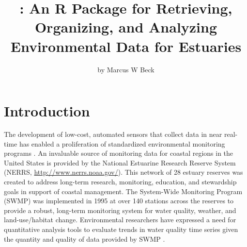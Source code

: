 \title{: An R Package for Retrieving, Organizing, and Analyzing Environmental Data for Estuaries}
\author{by Marcus W Beck}

\maketitle


\section{Introduction}

The development of low-cost, automated sensors that collect data in near real-time has enabled a proliferation of standardized environmental monitoring programs \citep{Glasgow04,Fries08}.  An invaluable source of monitoring data for coastal regions in the United States is provided by the National Estuarine Research Reserve System (NERRS, \url{http://www.nerrs.noaa.gov/}).  This network of 28 estuary reserves was created to address long-term research, monitoring, education, and stewardship goals in support of coastal management.  The System-Wide Monitoring Program (SWMP) was implemented in 1995 at over 140 stations across the reserves to provide a robust, long-term monitoring system for water quality, weather, and land-use/habitat change.  Environmental researchers have expressed a need for quantitative analysis tools to evaluate trends in water quality time series given the quantity and quality of data provided by SWMP \citep{SWMP14}.


